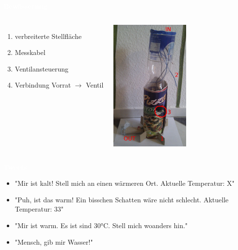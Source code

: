 \documentclass[bigger]{beamer}
\newcommand{\topic}[1]{{\huge{\textcolor{white}{\textbf{#1}}}}}
\begin{document}
\begin{frame}{\topic{Bewässerung}}
    \begin{columns}
        \begin{enumerate}
			\item verbreiterte Stellfläche
			\item Messkabel
			\item Ventilansteuerung
			\item Verbindung Vorrat $\rightarrow$ Ventil
        \end{enumerate}
        \includegraphics[width=150px]{System.jpg}
    \end{columns}
\end{frame} 

\begin{frame}{\topic{Tweets}}
	\begin{itemize}
      \item "Mir ist kalt! Stell mich an einen wärmeren Ort. Aktuelle Temperatur: X"
      \item "Puh, ist das warm! Ein bisschen Schatten wäre nicht schlecht. Aktuelle Temperatur: 33"
      \item "Mir ist warm. Es ist sind 30°C. Stell mich woanders hin."
      \item "Mensch, gib mir Wasser!"
	\end{itemize}
\end{frame}
\end{document}
